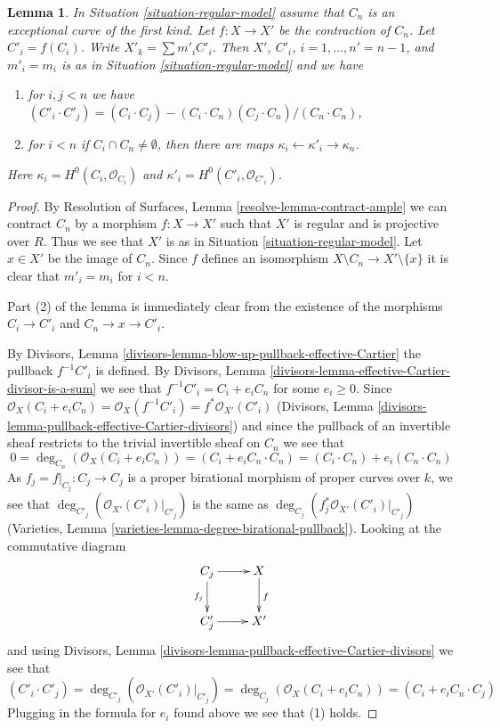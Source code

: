 \documentclass[10pt,a4paper]{amsart}
\theoremstyle{plain}
\newtheorem{lemma}[subsection]{Lemma}
\theoremstyle{definition}
\theoremstyle{remark}
\numberwithin{equation}{subsection}
\begin{document}
\begin{lemma}
\label{lemma-blowdown-regular-model}
In Situation \ref{situation-regular-model} assume that $C_n$ is
an exceptional curve of the first kind. Let $f : X \to X'$ be the
contraction of $C_n$. Let $C'_i = f(C_i)$. Write $X'_k = \sum m'_i C'_i$.
Then $X'$, $C'_i$, $i = 1, \ldots, n' = n - 1$, and $m'_i = m_i$
is as in Situation \ref{situation-regular-model} and we have
\begin{enumerate}
\item for $i, j < n$ we have
$(C'_i \cdot C'_j) =
(C_i \cdot C_j) - (C_i \cdot C_n) (C_j \cdot C_n) /(C_n \cdot C_n)$,
\item for $i < n$ if $C_i \cap C_n \not = \emptyset$, then there are
maps $\kappa_i \leftarrow \kappa'_i \rightarrow \kappa_n$.
\end{enumerate}
Here $\kappa_i = H^0(C_i, \mathcal{O}_{C_i})$ and
$\kappa'_i = H^0(C'_i, \mathcal{O}_{C'_i})$.
\end{lemma}

\begin{proof}
By Resolution of Surfaces, Lemma \ref{resolve-lemma-contract-ample}
we can contract $C_n$ by a morphism $f : X \to X'$ such that $X'$ is
regular and is projective over $R$. Thus we see that $X'$ is as in
Situation \ref{situation-regular-model}.
Let $x \in X'$ be the image of $C_n$.
Since $f$ defines an isomorphism $X \setminus C_n \to X' \setminus \{x\}$
it is clear that $m'_i = m_i$ for $i < n$.

\medskip\noindent
Part (2) of the lemma is immediately clear from
the existence of the morphisms $C_i \to C'_i$ and $C_n \to x \to C'_i$.

\medskip\noindent
By Divisors, Lemma \ref{divisors-lemma-blow-up-pullback-effective-Cartier}
the pullback $f^{-1}C'_i$ is defined. By
Divisors, Lemma \ref{divisors-lemma-effective-Cartier-divisor-is-a-sum}
we see that $f^{-1}C'_i = C_i + e_i C_n$ for some $e_i \geq 0$. Since
$\mathcal{O}_X(C_i + e_i C_n) = \mathcal{O}_X(f^{-1}C'_i) =
f^*\mathcal{O}_{X'}(C'_i)$
(Divisors, Lemma \ref{divisors-lemma-pullback-effective-Cartier-divisors})
and since the pullback of an invertible sheaf restricts to the
trivial invertible sheaf on $C_n$ we see that
$$
0 = \deg_{C_n}(\mathcal{O}_X(C_i + e_i C_n)) =
(C_i + e_i C_n \cdot C_n) = (C_i \cdot C_n) + e_i(C_n \cdot C_n)
$$
As $f_j = f|_{C_j} : C_j \to C_j$ is a
proper birational morphism of proper curves
over $k$, we see that $\deg_{C'_j}(\mathcal{O}_{X'}(C'_i)|_{C'_j})$ is the
same as $\deg_{C_j}(f_j^*\mathcal{O}_{X'}(C'_i)|_{C'_j})$
(Varieties, Lemma \ref{varieties-lemma-degree-birational-pullback}).
Looking at the commutative diagram
$$
\xymatrix{
C_j \ar[r] \ar[d]_{f_j} & X \ar[d]^f \\
C'_j \ar[r] & X'
}
$$
and using Divisors, Lemma
\ref{divisors-lemma-pullback-effective-Cartier-divisors}
we see that
$$
(C'_i \cdot C'_j) = \deg_{C'_j}(\mathcal{O}_{X'}(C'_i)|_{C'_j}) =
\deg_{C_j}(\mathcal{O}_X(C_i + e_i C_n)) = (C_i + e_i C_n \cdot C_j)
$$
Plugging in the formula for $e_i$ found above we see that (1) holds.
\end{proof}
\end{document}
